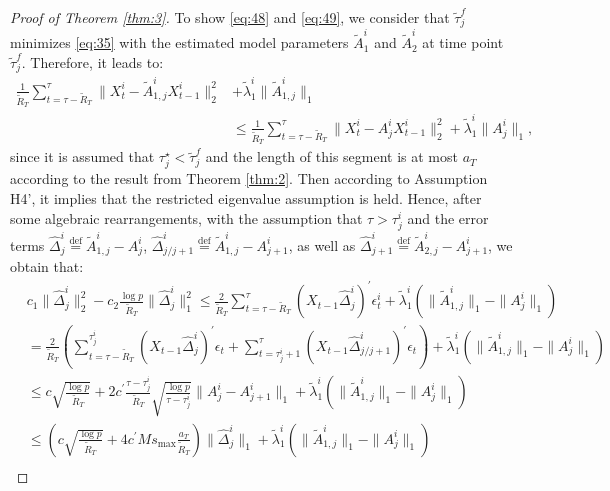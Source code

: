 \documentclass[11pt]{article}
\begin{document}
\begin{proof}[Proof of Theorem \ref{thm:3}]
To show \eqref{eq:48} and \eqref{eq:49}, we consider that $\widetilde{\tau}_j^f$ minimizes \eqref{eq:35} with the estimated model parameters $\widetilde{A}^i_1$ and $\widetilde{A}^i_2$ at time point $\widetilde{\tau}^f_j$. Therefore, it leads to:
\begin{equation*}
    \begin{aligned}
        \frac{1}{\widetilde{R}_T}\sum_{t=\tau-\widetilde{R}_T}^{\tau}\|X_t^i - \widetilde{A}^i_{1,j}X_{t-1}^i\|_2^2 &+ \widetilde{\lambda}^i_{1}\|\widetilde{A}^i_{1,j}\|_1 \\ &\leq \frac{1}{\widetilde{R}_T}\sum_{t=\tau-\widetilde{R}_T}^{\tau}\|X_t^i - A^i_jX_{t-1}^i\|_2^2 + \widetilde{\lambda}^i_1\|A_j^i\|_1,
    \end{aligned}
\end{equation*}
since it is assumed that $\tau_j^\star < \widetilde{\tau}^f_j$ and the length of this segment is at most $a_T$ according to the result from Theorem \ref{thm:2}. Then according to Assumption H4', it implies that the restricted eigenvalue assumption is held. Hence, after some algebraic rearrangements, with the assumption that $\tau > \tau^i_j$ and the error terms $\widehat{\Delta}_j^i \overset{\text{def}}{=} \widetilde{A}^i_{1,j} - A_j^i$, $\widehat{\Delta}^i_{j/j+1} \overset{\text{def}}{=} \widetilde{A}^i_{1,j} - A_{j+1}^i$, as well as $\widehat{\Delta}^i_{j+1} \overset{\text{def}}{=} \widetilde{A}^i_{2,j} - A_{j+1}^i$, we obtain that:
\begin{align*}
    &c_1\| \widehat{\Delta}^i_j \|_2^2 - c_2\frac{\log p}{\widetilde{R}_T}\|\widehat{\Delta}_j^i\|_1^2 
    \leq \frac{2}{\widetilde{R}_T}\sum_{t=\tau-\widetilde{R}_T}^{\tau}(X_{t-1}\widehat{\Delta}_j^i)^\prime\epsilon_t^i + \widetilde{\lambda}_1^i\left(\|\widetilde{A}_{1,j}^i\|_1 - \|A_j^i\|_1\right) \\
    &= \frac{2}{\widetilde{R}_T}\left(\sum_{t=\tau-\widetilde{R}_T}^{\tau_j^i}(X_{t-1}\widehat{\Delta}_j^i)^\prime\epsilon_t + \sum_{t=\tau_j^i+1}^{\tau}(X_{t-1}\widehat{\Delta}_{j/j+1}^i)^\prime\epsilon_t\right) + \widetilde{\lambda}_1^i\left(\|\widetilde{A}_{1,j}^i\|_1 - \|A_j^i\|_1\right) \\
    &\leq c\sqrt{\frac{\log p}{\widetilde{R}_T}} + 2c^\prime\frac{\tau-\tau_j^i}{\widetilde{R}_T}\sqrt{\frac{\log p}{\tau-\tau_j^i}}\|A_j^i - A_{j+1}^i\|_1
    + \widetilde{\lambda}_1^i\left(\|\widetilde{A}_{1,j}^i\|_1 - \|A_j^i\|_1\right) \\
    &\leq \left(c\sqrt{\frac{\log p}{\widetilde{R}_T}} + 4c^\prime Ms_{\max}\frac{a_T}{\widetilde{R}_T}\right)\|\widehat{\Delta}_j^i\|_1 + \widetilde{\lambda}_1^i\left(\|\widetilde{A}_{1,j}^i\|_1 - \|A_j^i\|_1\right) \\

\end{align*}
\end{proof}
\end{document}
